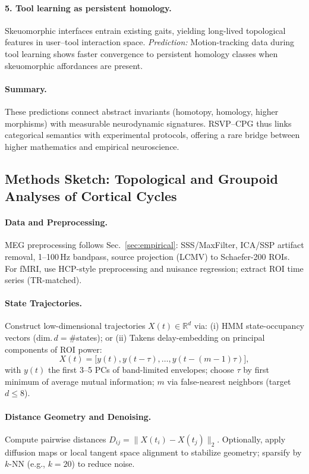 \documentclass{article}
\begin{document}
\paragraph{5. Tool learning as persistent homology.}  
Skeuomorphic interfaces entrain existing gaits, yielding long-lived topological features in user–tool interaction space.  
\emph{Prediction:} Motion-tracking data during tool learning shows faster convergence to persistent homology classes when skeuomorphic affordances are present.

\paragraph{Summary.}  
These predictions connect abstract invariants (homotopy, homology, higher morphisms) with measurable neurodynamic signatures. RSVP--CPG thus links categorical semantics with experimental protocols, offering a rare bridge between higher mathematics and empirical neuroscience.

\subsection{Methods Sketch: Topological and Groupoid Analyses of Cortical Cycles}

\paragraph{Data and Preprocessing.}
MEG preprocessing follows Sec.~\ref{sec:empirical}: SSS/MaxFilter, ICA/SSP artifact removal, 1--100\,Hz bandpass, source projection (LCMV) to Schaefer-200 ROIs. For fMRI, use HCP-style preprocessing and nuisance regression; extract ROI time series (TR-matched).

\paragraph{State Trajectories.}
Construct low-dimensional trajectories $X(t)\in\mathbb{R}^d$ via:
(i) HMM state-occupancy vectors (dim.\,$d{=}$\#states); or
(ii) Takens delay-embedding on principal components of ROI power:
\[
X(t) = \big[ y(t), y(t-\tau), \dots, y(t-(m-1)\tau) \big],
\]
with $y(t)$ the first 3--5 PCs of band-limited envelopes; choose $\tau$ by first minimum of average mutual information; $m$ via false-nearest neighbors (target $d{\le}8$).

\paragraph{Distance Geometry and Denoising.}
Compute pairwise distances $D_{ij}=\|X(t_i)-X(t_j)\|_2$. Optionally, apply diffusion maps or local tangent space alignment to stabilize geometry; sparsify by $k$-NN (e.g., $k{=}20$) to reduce noise.
\end{document}
